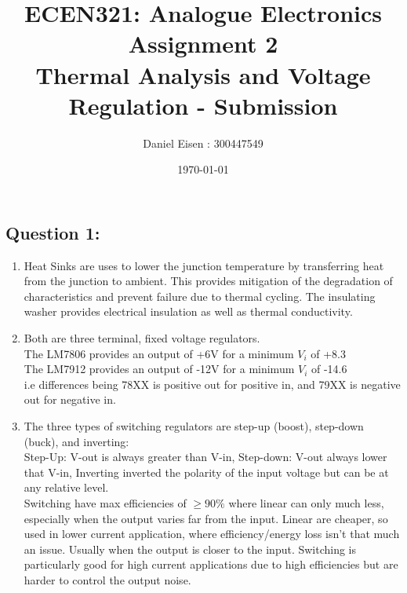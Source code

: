 \documentclass[11pt]{article}
\title{ECEN321: Analogue Electronics \\ Assignment 2 \\ Thermal Analysis and Voltage Regulation - Submission}
\author{Daniel Eisen : 300447549}
\date{\today}
\begin{document}
\begin{preview}

\maketitle
\section*{Question 1:}
\begin{enumerate}[label=\alph*)]
          \item  Heat Sinks are uses to lower the junction temperature by transferring heat from the junction to ambient. This provides mitigation of the degradation of characteristics and prevent failure due to thermal cycling. The insulating washer provides electrical insulation as well as thermal conductivity.
          \item Both are three terminal, fixed voltage regulators. \\
          The LM7806 provides an output of +6V for a minimum $V_i$ of +8.3\\
          The LM7912 provides an output of -12V for a minimum $V_i$ of -14.6\\
          i.e differences being 78XX is positive out for positive in, and 79XX is negative out for negative in.
          \item The three types of switching regulators are step-up (boost), step-down (buck), and inverting:
          \\ Step-Up: V-out is always greater than V-in, Step-down: V-out always lower that V-in, Inverting inverted the polarity of the input voltage but can be at any relative level. \\ Switching have max efficiencies of $\ge90\%$ where linear can only much less, especially when the output varies far from the input. Linear are cheaper, so used in lower current application, where efficiency/energy loss isn't that much an issue. Usually when the output is closer to the input. Switching is particularly good for high current applications due to high efficiencies but are harder to control the output noise.

\end{enumerate}
\end{preview}
\end{document}

